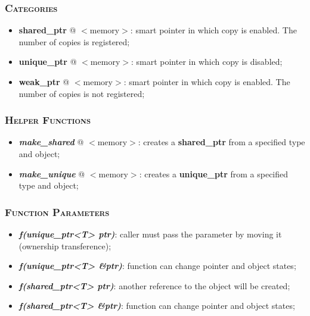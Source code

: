 \documentclass[10pt]{article}
\begin{document}
\begin{multicols*}{5}
{\subsubsection*{\textsc{Categories}} 
\begin{itemize}[leftmargin=*,topsep=0.25pt]
  \setlength\itemsep{-1.8pt}
	\item  {\textbf{shared\_ptr}} @ $<$memory$>$: smart pointer in which copy is enabled. The number of copies is registered;
	\item  {\textbf{unique\_ptr}} @ $<$memory$>$: smart pointer in which copy is disabled;
	\item  {\textbf{weak\_ptr}} @ $<$memory$>$: smart pointer in which copy is enabled. The number of copies is not registered;
\end{itemize}

\subsubsection*{\textsc{Helper Functions}} 
\begin{itemize}[leftmargin=*,topsep=0.25pt]
  \setlength\itemsep{-1.8pt}
	\item  \emph{\textbf{make\_shared}} @ $<$memory$>$: creates a \textbf{shared\_ptr} from a specified type and object;
	\item  \emph{\textbf{make\_unique}} @ $<$memory$>$: creates a \textbf{unique\_ptr} from a specified type and object;
\end{itemize}

\subsubsection*{\textsc{Function Parameters}} 
\begin{itemize}[leftmargin=*,topsep=0.25pt]
  \setlength\itemsep{-1.8pt}
	\item  \emph{\textbf{f(unique\_ptr<T> ptr)}}: caller must pass the parameter by moving it (ownership transference);
	\item  \emph{\textbf{f(unique\_ptr<T> \&ptr)}}: function can change pointer and object states;
	\item  \emph{\textbf{f(shared\_ptr<T> ptr)}}: another reference to the object will be created;
	\item  \emph{\textbf{f(shared\_ptr<T> \&ptr)}}: function can change pointer and object states;
\end{itemize}

}


\end{multicols*}
\end{document}
